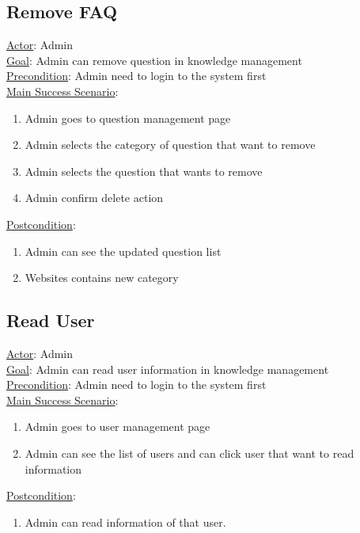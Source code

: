 \documentclass[12pt,oneside,openright,a4paper]{cpe-english-project}
\begin{document}
\subsection{Remove FAQ}
\underline{Actor}: Admin\\
\underline{Goal}: Admin can remove question in knowledge management\\
\underline{Precondition}: Admin need to login to the system first\\
\underline{Main Success Scenario}:
\begin{enumerate}[label={\arabic*.}]
	\item Admin goes to question management page
	\item Admin selects the category of question that want to remove
	\item Admin selects the question that wants to remove
	\item Admin confirm delete action
\end{enumerate}
\underline{Postcondition}: 
\begin{enumerate}[label={\arabic*.}]
	\item Admin can see the updated question list
	\item Websites contains new category
\end{enumerate}

\subsection{Read User}
\underline{Actor}: Admin\\
\underline{Goal}: Admin can read user information in knowledge management\\
\underline{Precondition}: Admin need to login to the system first\\
\underline{Main Success Scenario}:
\begin{enumerate}[label={\arabic*.}]
	\item Admin goes to user management page
	\item Admin can see the list of users and can click user that want to read information
\end{enumerate}
\underline{Postcondition}: 
\begin{enumerate}[label={\arabic*.}]
	\item Admin can read information of that user.
\end{enumerate}
\end{document}
